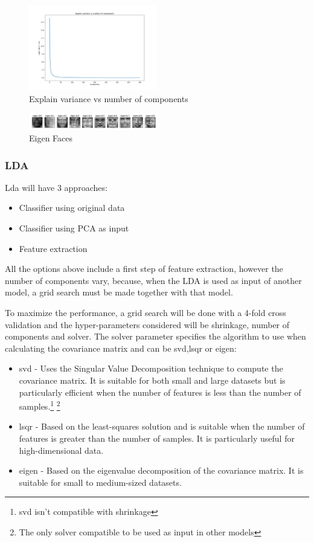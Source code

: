 \documentclass[12pt,a4paper,twocolumn]{article}
\begin{document}
\begin{figure}[H]

\includegraphics[width=0.5\textwidth]{images2/pca3(3).png}
\caption{\label{fig: pca3} Explain variance vs number of components}
\end{figure}

\begin{figure}[H]
\centering
\includegraphics[width=0.5\textwidth]{images2/eigen.PNG}
\caption{\label{fig: eigen} Eigen Faces}
\end{figure}


\subsubsection{LDA}
\par Lda will have 3 approaches:
\begin{itemize}
    \item Classifier using original data
    \item Classifier using PCA as input
    \item Feature extraction
\end{itemize}
\par All the options above include a first step of feature extraction, however the number of components vary, because, when the LDA is used as input of another model, a grid search must be made together with that model.
\par To  maximize the performance, a grid search will be done with a 4-fold cross validation and the hyper-parameters considered will be shrinkage, number of components and solver.\break
The solver parameter specifies the algorithm to use when calculating the covariance matrix and can be svd,lsqr or eigen:

\begin{itemize}
    \item  svd - Uses the Singular Value Decomposition technique to compute the covariance matrix. It is suitable for both small and large datasets but is particularly efficient when the number of features is less than the number of samples.\footnote{svd isn't compatible with shrinkage}
    \footnote{The only solver compatible to be used as input in other models}
    \item lsqr - Based on the least-squares solution and is suitable when the number of features is greater than the number of samples. It is particularly useful for high-dimensional data.
    \item eigen - Based on the eigenvalue decomposition of the covariance matrix. It is suitable for small to medium-sized datasets.
\end{itemize}
\end{document}
